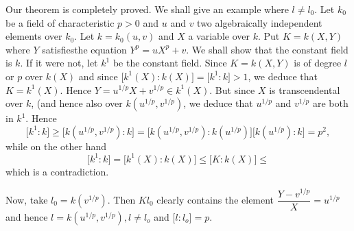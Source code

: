 Our theorem is completely proved. We shall give an example where $l
\neq l_0$. Let $k_0$ be a field of characteristic $p > 0$ and $u$ and
$v$ two algebraically independent elements over $k_0$. Let $k = k_0
(u, v)$ and $X$ a variable over $k$. Put $K = k (X, Y)$ where $Y$
satisfies\pageoriginale the equation $Y^p = u X^p + v$. We shall show that the
constant field is $k$. If it were not, let $k^1$ be the constant
field. Since $K = k(X, Y)$ is of degree $l$ or $p$ over $k(X)$ and since
$\big [k^1 (X) : k(X) \big]= \big [k^1 : k \big] > 1$, we deduce that
$K = k^1 (X)$. Hence $Y = u^{1/p} X + v^{1/p} \in k^1 (X)$. But since
$X$ is transcendental over $k $, (and hence also over
$k (u^{1/p}, v^{1/p})$, we deduce that $u^{1/p}$ and $v^{1/p} $ are
both in $k^1$. Hence  
$$
\big [ k^1 : k \big] \ge \big [k(u^{1/p}, v ^{1/p}) : k \big] = \big
     [k(u^{1/p}, v^{1/p}) : k (u^{1/p}) \big] \big [ k(u^{1/p}) : k
       \big] = p^2, 
$$
while on the other hand
$$
\big [ k^1 : k \big] = \big [k^1 (X) : k(X) \big ] \le \big [ K : k(X)
  \big] \le 
$$
which is a contradiction.

Now, take $l_0 = k(v^{1/p})$. Then $K l_0$ clearly contains the element
$\dfrac{Y - v^{1/p}}{X} = u^{1/p}$ and hence $l =  k(u^{1/p},
v^{1/p}), l \neq l_o$ and $\big [l : l_o \big] = p$. 
